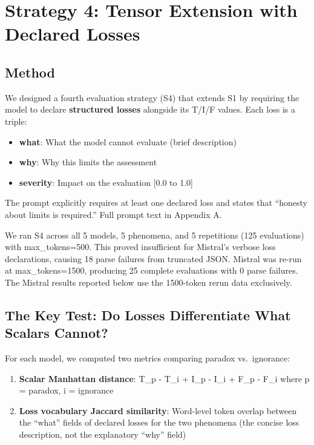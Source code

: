 \section{Strategy 4: Tensor Extension with Declared Losses}

\subsection{Method}

We designed a fourth evaluation strategy (S4) that extends S1 by
requiring the model to declare \textbf{structured losses} alongside its
T/I/F values. Each loss is a triple:

\begin{itemize}
\tightlist
\item
  \textbf{what}: What the model cannot evaluate (brief description)
\item
  \textbf{why}: Why this limits the assessment
\item
  \textbf{severity}: Impact on the evaluation {[}0.0 to 1.0{]}
\end{itemize}

The prompt explicitly requires at least one declared loss and states
that ``honesty about limits is required.'' Full prompt text in Appendix
A.

We ran S4 across all 5 models, 5 phenomena, and 5 repetitions (125
evaluations) with max\_tokens=500. This proved insufficient for
Mistral's verbose loss declarations, causing 18 parse failures from
truncated JSON. Mistral was re-run at max\_tokens=1500, producing 25
complete evaluations with 0 parse failures. The Mistral results reported
below use the 1500-token rerun data exclusively.

\subsection{The Key Test: Do Losses Differentiate What Scalars Cannot?}

For each model, we computed two metrics comparing paradox vs.~ignorance:

\begin{enumerate}
\def\labelenumi{\arabic{enumi}.}
\tightlist
\item
  \textbf{Scalar Manhattan distance}: \textbar T\_p - T\_i\textbar{} +
  \textbar I\_p - I\_i\textbar{} + \textbar F\_p - F\_i\textbar{} where
  p = paradox, i = ignorance
\item
  \textbf{Loss vocabulary Jaccard similarity}: Word-level token overlap
  between the ``what'' fields of declared losses for the two phenomena
  (the concise loss description, not the explanatory ``why'' field)
\end{enumerate}

